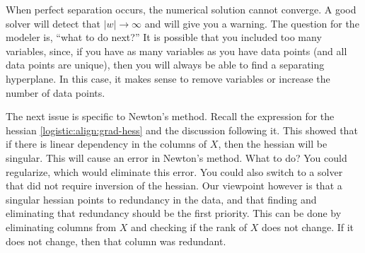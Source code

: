 When perfect separation occurs, the numerical solution cannot converge.  A good solver will detect that $|w|\to\infty$ and will give you a warning.  The question for the modeler is, ``what to do next?''  It is possible that you included too many variables, since, if you have as many variables as you have data points (and all data points are unique), then you will always be able to find a separating hyperplane.  In this case, it makes sense to remove variables or increase the number of data points.

The next issue is specific to Newton's method.  Recall the expression for the hessian \eqref{logistic:align:grad-hess} and the discussion following it.  This showed that if there is linear dependency in the columns of $X$, then the hessian will be singular.  This will cause an error in Newton's method.  What to do?  You could regularize, which would eliminate this error.  You could also switch to a solver that did not require inversion of the hessian.  Our viewpoint however is that a singular hessian points to redundancy in the data, and that finding and eliminating that redundancy should be the first priority.  This can be done by eliminating columns from $X$ and checking if the rank of $X$ does not change.  If it does not change, then that column was redundant.



